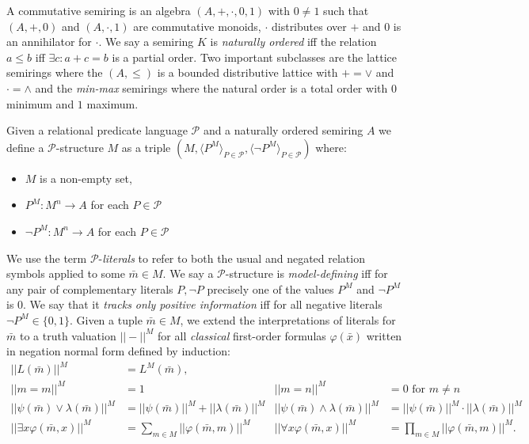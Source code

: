 \documentclass{lmcs} %
\newcommand{\?}{\ensuremath{\mkern0.4\thinmuskip}}
\let\phi=\varphi
\newcommand{\CP}{\mathcal{P}}
\begin{document}
\begin{defi}
    A commutative semiring is an algebra $(A,+,\cdot,0,1)$ with $0\not=1$ such that $(A,+,0)$ and $(A,\cdot,1)$ are commutative monoids, $\cdot$ distributes over $+$ and $0$ is an annihilator for $\cdot$. We say a semiring $K$ is \textit{naturally ordered} iff the relation $a\leq b$ iff $\exists c:a+c=b$ is a partial order. Two important subclasses are the lattice semirings where the $(A,\leq)$ is a bounded distributive lattice with $+=\lor$ and $\cdot=\land$ and the \textit{min-max} semirings where the natural order is a total order with $0$ minimum and $1$ maximum. 

    Given a relational predicate language $\CP$ and a naturally ordered semiring $A$ we define a $\CP$-structure $M$ as a triple $(M,\langle P^M\rangle_{P\in\CP},\langle \neg P^M\rangle_{P\in \CP})$ where:\begin{itemize}
        \item $M$ is a non-empty set,
        \item $P^M\colon M^n\rightarrow A$ for each $P\in\CP$
        \item $\neg P^M\colon M^n\rightarrow A$ for each $P\in\CP$ 
    \end{itemize}
    We use the term $\CP$-\textit{literals} to refer to both the usual and negated relation symbols applied to some $\bar{m}\in M$. We say a $\CP$-structure is \textit{model-defining} iff for any pair of complementary literals $P,\neg P$ precisely one of the values $P^M$ and $\neg P^M$ is 0. We say that it \textit{tracks only positive information} iff for all negative literals $\neg P^M\in\{0,1\}$. 
    Given a tuple $\bar{m}\in M$, we extend the interpretations of literals for $\bar{m}$ to a truth valuation $||-||^M$ for all \textit{classical} first-order formulas $\phi(\bar{x})$ written in negation normal form defined by induction:\begin{align*}
        ||L(\bar{m})||^M &= L^M(\bar{m}),& \\
        ||m=m||^M&= 1 & ||m=n||^M&=0 \text{ for }m\not=n \\
        ||\psi(\bar{m})\lor\lambda(\bar{m})||^M&=||\psi(\bar{m})||^M + ||\lambda(\bar{m})||^M & ||\psi(\bar{m})\land\lambda(\bar{m})||^M&=||\psi(\bar{m})||^M\cdot||\lambda(\bar{m})||^M\\
        ||\exists x\phi(\bar{m},x)||^M&=\sum\limits_{m\in M}||\phi(\bar{m},m)||^M & ||\forall x\phi(\bar{m},x)||^M&=\prod\limits_{m\in M}||\phi(\bar{m},m)||^M.
    \end{align*}
\end{defi}
\end{document}
